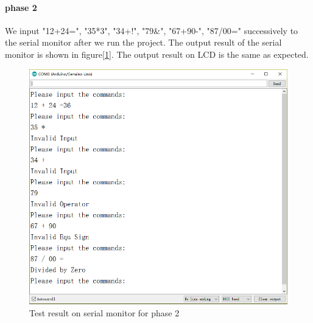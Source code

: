 \paragraph{phase 2}
We input "12+24=", "35*3", "34+!", "79\&", "67+90-", "87/00=" successively to the serial monitor after we run the project. The output result of the serial monitor is shown in figure[\ref{fig:test2}]. The output result on LCD is the same as expected.
\begin{figure}[!htbp]
	\centering
	\includegraphics[width = \linewidth]{images/test2.png}
	\caption{Test result on serial monitor for phase 2}
	\label{fig:test2}
\end{figure}

